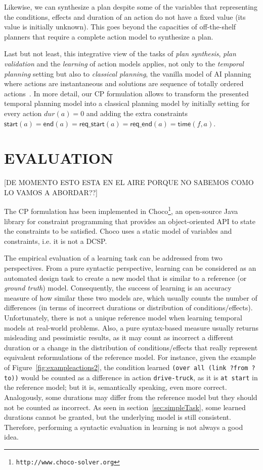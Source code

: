 \documentclass{ecai}
\newcommand{\start}{\mathsf{start}}%
\newcommand{\en}{\mathsf{end}}     %
\newcommand{\tim}{\mathsf{time}}   %
\newcommand{\reqs}{\mathsf{req\_{start}}} %
\newcommand{\reqe}{\mathsf{req\_{end}}}   %
\begin{document}
Likewise, we can synthesize a plan despite some of the variables that representing the conditions, effects and duration of an action do not have a fixed value (its value is initially unknown). This goes beyond the capacities of off-the-shelf planners that require a complete action model to synthesize a plan.

Last but not least, this integrative view of the tasks of {\em plan synthesis}, {\em plan validation} and the {\em learning} of action models applies, not only to the {\em temporal planning} setting but also to {\em classical planning}, the vanilla model of AI planning where actions are instantaneous and solutions are sequence of totally ordered actions~\cite{geffner2013concise}. In more detail, our CP formulation allows to transform the presented temporal planning model into a classical planning model by initially setting for every action $dur(a)=0$ and adding the extra constraints $\start(a)=\en(a)=\reqs(a)=\reqe(a)=\tim(f,a)$.



  
\section{EVALUATION}
\label{sec:evaluation}

[DE MOMENTO ESTO ESTA EN EL AIRE PORQUE NO SABEMOS COMO LO VAMOS A ABORDAR??]

The CP formulation has been implemented in \textsf{Choco}\footnote{\texttt{http://www.choco-solver.org}}, an open-source Java library for constraint programming that provides an object-oriented API to state the constraints to be satisfied. \textsf{Choco} uses a static model of variables and constraints, i.e. it is not a DCSP.

The empirical evaluation of a learning task can be addressed from two perspectives. From a pure syntactic perspective, learning can be considered as an automated design task to create a new model that is similar to a reference (or {\em ground truth}) model. Consequently, the success of learning is an accuracy measure of how similar these two models are, which usually counts the number of differences (in terms of incorrect durations or distribution of conditions/effects). Unfortunately, there is not a unique reference model when learning temporal models at real-world problems. Also, a pure syntax-based measure usually returns misleading and pessimistic results, as it may count as incorrect a different duration or a change in the distribution of conditions/effects that really represent equivalent reformulations of the reference model. For instance, given the example of Figure~\ref{fig:exampleactions2}, the condition learned \texttt{(over all (link ?from ?to))} would be counted as a difference in action \texttt{drive-truck}, as it is \texttt{at start} in the reference model; but it is, semantically speaking, even more correct. Analogously, some durations may differ from the reference model but they should not be counted as incorrect. As seen in section~\ref{sec:simpleTask}, some learned durations cannot be granted, but the underlying model is still consistent. Therefore, performing a syntactic evaluation in learning is not always a good idea.
\end{document}
